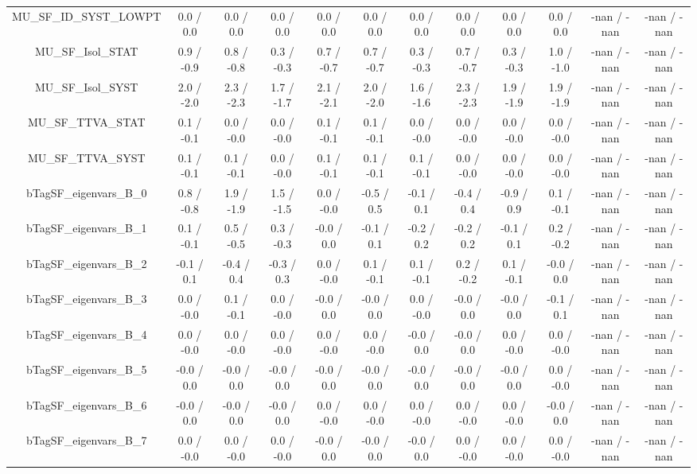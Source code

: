 \begin{table}[htbp]
\begin{center}
\begin{tabular}{|c|c|c|c|c|c|c|c|c|c|c|c|}
  MU_SF_ID_SYST_LOWPT & 0.0 / 0.0 & 0.0 / 0.0 & 0.0 / 0.0 & 0.0 / 0.0 & 0.0 / 0.0 & 0.0 / 0.0 & 0.0 / 0.0 & 0.0 / 0.0 & 0.0 / 0.0 & -nan / -nan & -nan / -nan \\ 
  MU_SF_Isol_STAT & 0.9 / -0.9 & 0.8 / -0.8 & 0.3 / -0.3 & 0.7 / -0.7 & 0.7 / -0.7 & 0.3 / -0.3 & 0.7 / -0.7 & 0.3 / -0.3 & 1.0 / -1.0 & -nan / -nan & -nan / -nan \\ 
  MU_SF_Isol_SYST & 2.0 / -2.0 & 2.3 / -2.3 & 1.7 / -1.7 & 2.1 / -2.1 & 2.0 / -2.0 & 1.6 / -1.6 & 2.3 / -2.3 & 1.9 / -1.9 & 1.9 / -1.9 & -nan / -nan & -nan / -nan \\ 
  MU_SF_TTVA_STAT & 0.1 / -0.1 & 0.0 / -0.0 & 0.0 / -0.0 & 0.1 / -0.1 & 0.1 / -0.1 & 0.0 / -0.0 & 0.0 / -0.0 & 0.0 / -0.0 & 0.0 / -0.0 & -nan / -nan & -nan / -nan \\ 
  MU_SF_TTVA_SYST & 0.1 / -0.1 & 0.1 / -0.1 & 0.0 / -0.0 & 0.1 / -0.1 & 0.1 / -0.1 & 0.1 / -0.1 & 0.0 / -0.0 & 0.0 / -0.0 & 0.0 / -0.0 & -nan / -nan & -nan / -nan \\ 
  bTagSF_eigenvars_B_0 & 0.8 / -0.8 & 1.9 / -1.9 & 1.5 / -1.5 & 0.0 / -0.0 & -0.5 / 0.5 & -0.1 / 0.1 & -0.4 / 0.4 & -0.9 / 0.9 & 0.1 / -0.1 & -nan / -nan & -nan / -nan \\ 
  bTagSF_eigenvars_B_1 & 0.1 / -0.1 & 0.5 / -0.5 & 0.3 / -0.3 & -0.0 / 0.0 & -0.1 / 0.1 & -0.2 / 0.2 & -0.2 / 0.2 & -0.1 / 0.1 & 0.2 / -0.2 & -nan / -nan & -nan / -nan \\ 
  bTagSF_eigenvars_B_2 & -0.1 / 0.1 & -0.4 / 0.4 & -0.3 / 0.3 & 0.0 / -0.0 & 0.1 / -0.1 & 0.1 / -0.1 & 0.2 / -0.2 & 0.1 / -0.1 & -0.0 / 0.0 & -nan / -nan & -nan / -nan \\ 
  bTagSF_eigenvars_B_3 & 0.0 / -0.0 & 0.1 / -0.1 & 0.0 / -0.0 & -0.0 / 0.0 & -0.0 / 0.0 & 0.0 / -0.0 & -0.0 / 0.0 & -0.0 / 0.0 & -0.1 / 0.1 & -nan / -nan & -nan / -nan \\ 
  bTagSF_eigenvars_B_4 & 0.0 / -0.0 & 0.0 / -0.0 & 0.0 / -0.0 & 0.0 / -0.0 & 0.0 / -0.0 & -0.0 / 0.0 & -0.0 / 0.0 & 0.0 / -0.0 & 0.0 / -0.0 & -nan / -nan & -nan / -nan \\ 
  bTagSF_eigenvars_B_5 & -0.0 / 0.0 & -0.0 / 0.0 & -0.0 / 0.0 & -0.0 / 0.0 & -0.0 / 0.0 & -0.0 / 0.0 & -0.0 / 0.0 & -0.0 / 0.0 & 0.0 / -0.0 & -nan / -nan & -nan / -nan \\ 
  bTagSF_eigenvars_B_6 & -0.0 / 0.0 & -0.0 / 0.0 & -0.0 / 0.0 & 0.0 / -0.0 & 0.0 / -0.0 & 0.0 / -0.0 & 0.0 / -0.0 & 0.0 / -0.0 & -0.0 / 0.0 & -nan / -nan & -nan / -nan \\ 
  bTagSF_eigenvars_B_7 & 0.0 / -0.0 & 0.0 / -0.0 & 0.0 / -0.0 & -0.0 / 0.0 & -0.0 / 0.0 & -0.0 / 0.0 & 0.0 / -0.0 & 0.0 / -0.0 & 0.0 / -0.0 & -nan / -nan & -nan / -nan \\ 

\end{tabular}
\end{center}
\end{table}
